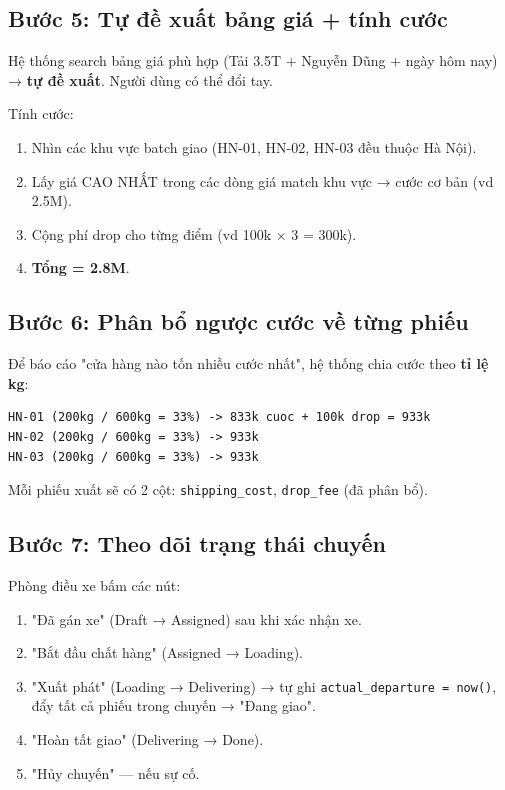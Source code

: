 \subsection{Bước 5: Tự đề xuất bảng giá + tính cước}

Hệ thống search bảng giá phù hợp (Tải 3.5T + Nguyễn Dũng + ngày hôm nay) → \textbf{tự đề xuất}. Người dùng có thể đổi tay.

Tính cước:
\begin{enumerate}
    \item Nhìn các khu vực batch giao (HN-01, HN-02, HN-03 đều thuộc Hà Nội).
    \item Lấy giá CAO NHẤT trong các dòng giá match khu vực → cước cơ bản (vd 2.5M).
    \item Cộng phí drop cho từng điểm (vd 100k × 3 = 300k).
    \item \textbf{Tổng = 2.8M}.
\end{enumerate}

\subsection{Bước 6: Phân bổ ngược cước về từng phiếu}

Để báo cáo "cửa hàng nào tốn nhiều cước nhất", hệ thống chia cước theo \textbf{tỉ lệ kg}:

\begin{lstlisting}[style=shell]
HN-01 (200kg / 600kg = 33%) -> 833k cuoc + 100k drop = 933k
HN-02 (200kg / 600kg = 33%) -> 933k
HN-03 (200kg / 600kg = 33%) -> 933k
\end{lstlisting}

Mỗi phiếu xuất sẽ có 2 cột: \texttt{shipping\_cost}, \texttt{drop\_fee} (đã phân bổ).

\subsection{Bước 7: Theo dõi trạng thái chuyến}

Phòng điều xe bấm các nút:

\begin{enumerate}
    \item "Đã gán xe" (Draft → Assigned) sau khi xác nhận xe.
    \item "Bắt đầu chất hàng" (Assigned → Loading).
    \item "Xuất phát" (Loading → Delivering) → tự ghi \texttt{actual\_departure = now()}, đẩy tất cả phiếu trong chuyến → "Đang giao".
    \item "Hoàn tất giao" (Delivering → Done).
    \item "Hủy chuyến" --- nếu sự cố.
\end{enumerate}

